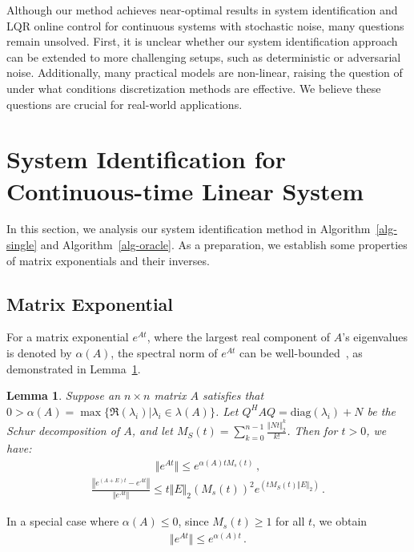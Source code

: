 \documentclass{article}
\newtheorem{lemma}[theorem]{Lemma}
\theoremstyle{definition}
\begin{document}
Although our method achieves near-optimal results in system identification and LQR online control for continuous systems with stochastic noise, many questions remain unsolved. First, it is unclear whether our system identification approach can be extended to more challenging setups, such as deterministic or adversarial noise. Additionally, many practical models are non-linear, raising the question of under what conditions discretization methods are effective. We believe these questions are crucial for real-world applications.




\newpage
\appendix

\section{System Identification for Continuous-time Linear System}
In this section, we analysis our system identification method in Algorithm~\ref{alg-single} and Algorithm~\ref{alg-oracle}. As a preparation, we establish some properties of matrix exponentials and their inverses.
\subsection{Matrix Exponential}
For a matrix exponential $e^{At}$, where the largest real component of $A$'s eigenvalues is denoted by $\alpha(A)$, the spectral norm of $e^{At}$ can be well-bounded~\citep{golub2013matrix}, as demonstrated in Lemma~\ref{lem:matrix}.

\begin{lemma}\label{lem:matrix}
	Suppose an $n\times n$ matrix $A$ satisfies that $0>\alpha(A)=\max\{\Re(\lambda_{i})\vert \lambda_{i}\in \lambda(A) \}$. Let $Q^{H}AQ=\mathrm{diag}(\lambda_{i})+N$ be the Schur decomposition of $A$, and let $M_{S}(t)=\sum_{k=0}^{n-1}\frac{\Vert Nt\Vert _{2}^{k}}{k!}$. Then for $t>0$, we have:
\begin{align}\label{eq:e^At}
\Vert e^{At}\Vert \leq e^{\alpha(A)tM_{s}(t)}\,,
\end{align}
\begin{align}\label{eq:e^(A+E)t}
\frac{\left\Vert e^{(A+E)t}-e^{At}\right\Vert}{\Vert e^{At}\Vert }\leq t\Vert E\Vert _{2}(M_{s}(t))^{2}e^{(tM_{S}(t)\Vert E\Vert _{2})}\,.
\end{align}	
\end{lemma}

In a special case where $\alpha(A)\leq 0$, since $M_{s}(t)\geq 1$ for all $t$, we obtain 
\begin{align*}
    \Vert e^{At}\Vert \leq e^{\alpha(A)t}\,.
\end{align*}
\end{document}
